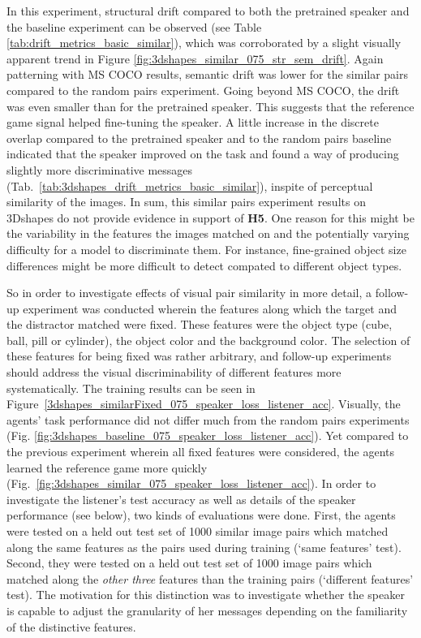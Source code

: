 In this experiment, structural drift compared to both the pretrained speaker and the baseline experiment can be observed (see Table \ref{tab:drift_metrics_basic_similar}), which was corroborated by a slight visually apparent trend in Figure \ref{fig:3dshapes_similar_075_str_sem_drift}. Again patterning with MS COCO results, semantic drift was lower for the similar pairs compared to the random pairs experiment. Going beyond MS COCO, the drift was even smaller than for the pretrained speaker. This suggests that the reference game signal helped fine-tuning the speaker.
A little increase in the discrete overlap compared to the pretrained speaker and to the random pairs baseline indicated that the speaker improved on the task and found a way of producing slightly more discriminative messages (Tab.~\ref{tab:3dshapes_drift_metrics_basic_similar}), inspite of perceptual similarity of the images. In sum, this similar pairs experiment results on 3Dshapes do not provide evidence in support of \textbf{H5}. One reason for this might be the variability in the features the images matched on and the potentially varying difficulty for a model to discriminate them. For instance, fine-grained object size differences might be more difficult to detect compated to different object types.

So in order to investigate effects of visual pair similarity in more detail, a follow-up experiment was conducted wherein the features along which the target and the distractor matched were fixed. These features were the object type (cube, ball, pill or cylinder), the object color and the background color. The selection of these features for being fixed was rather arbitrary, and follow-up experiments should address the visual discriminability of different features more systematically. The training results can be seen in Figure~\ref{3dshapes_similarFixed_075_speaker_loss_listener_acc}. Visually, the agents' task performance did not differ much from the random pairs experiments (Fig. \ref{fig:3dshapes_baseline_075_speaker_loss_listener_acc}). Yet compared to the previous experiment wherein all fixed features were considered, the agents learned the reference game more quickly (Fig.~\ref{fig:3dshapes_similar_075_speaker_loss_listener_acc}). In order to investigate the listener's test accuracy as well as details of the speaker performance (see below), two kinds of evaluations were done. First, the agents were tested on a held out test set of 1000 similar image pairs which matched along the same features as the pairs used during training (`same features' test). Second, they were tested on a held out test set of 1000 image pairs which matched along the \emph{other three} features than the training pairs (`different features' test). The motivation for this distinction was to investigate whether the speaker is capable to adjust the granularity of her messages depending on the familiarity of the distinctive features.

